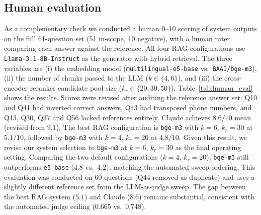 \documentclass[fleqn,moreauthors,10pt]{ds_report}
\begin{document}
\subsection*{Human evaluation}
As a complementary check we conducted a human 0--10 scoring of system outputs on the full 61-question set (51 in-scope, 10 negative), with a human rater comparing each answer against the reference. All four RAG configurations use \texttt{Llama-3.1-8B-Instruct} as the generator with hybrid retrieval. The three variables are (i) the embedding model (\texttt{multilingual-e5-base} vs.\ \texttt{BAAI/bge-m3}), (ii) the number of chunks passed to the LLM ($k \in \{4, 6\}$), and (iii) the cross-encoder reranker candidate pool size ($k_r \in \{20, 30, 50\}$). Table~\ref{tab:human_eval} shows the results. Scores were revised after auditing the reference answer set: Q10 and Q41 had inverted correct answers, Q43 had transposed phone numbers, and Q13, Q30, Q37 and Q56 lacked references entirely. Claude achieves $8.6/10$ mean (revised from $9.1$). The best RAG configuration is \texttt{bge-m3} with $k{=}6$, $k_r{=}30$ at $5.1/10$, followed by \texttt{bge-m3} with $k{=}4$, $k_r{=}20$ at $4.8/10$. Given this result, we revise our system selection to \texttt{bge-m3} at $k{=}6$, $k_r{=}30$ as the final operating setting. Comparing the two default configurations ($k{=}4$, $k_r{=}20$), \texttt{bge-m3} still outperforms \texttt{e5-base} ($4.8$ vs.\ $4.2$), matching the automated sweep ordering. This evaluation was conducted on 60 questions (Q44 removed as duplicate) and uses a slightly different reference set from the LLM-as-judge sweep. The gap between the best RAG system ($5.1$) and Claude ($8.6$) remains substantial, consistent with the automated judge ceiling ($0.665$ vs.\ $0.748$).
\end{document}
